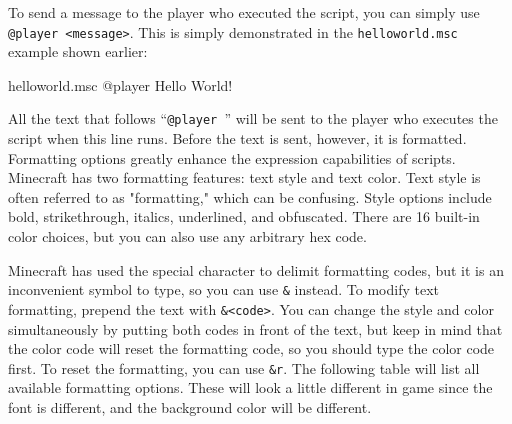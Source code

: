 \documentclass[oneside]{book}
\begin{document}
To send a message to the player who executed the script, you can simply use \texttt{@player <message>}. This is simply demonstrated in the \texttt{helloworld.msc} example shown earlier:

\begin{msccode}{helloworld.msc}
@player Hello World!
\end{msccode}

All the text that follows ``\texttt{@player }'' will be sent to the player who executes the script when this line runs. Before the text is sent, however, it is formatted. Formatting options greatly enhance the expression capabilities of scripts. Minecraft has two formatting features: text style and text color. Text style is often referred to as "formatting," which can be confusing. Style options include bold, strikethrough, italics, underlined, and obfuscated. There are 16 built-in color choices, but you can also use any arbitrary hex code.

Minecraft has used the special character \text{\S} to delimit formatting codes, but it is an inconvenient symbol to type, so you can use \texttt{\&} instead. To modify text formatting, prepend the text with \texttt{\&<code>}. You can change the style and color simultaneously by putting both codes in front of the text, but keep in mind that the color code will reset the formatting code, so you should type the color code first. To reset the formatting, you can use \texttt{\&r}. The following table will list all available formatting options. These will look a little different in game since the font is different, and the background color will be different.

\end{document}
